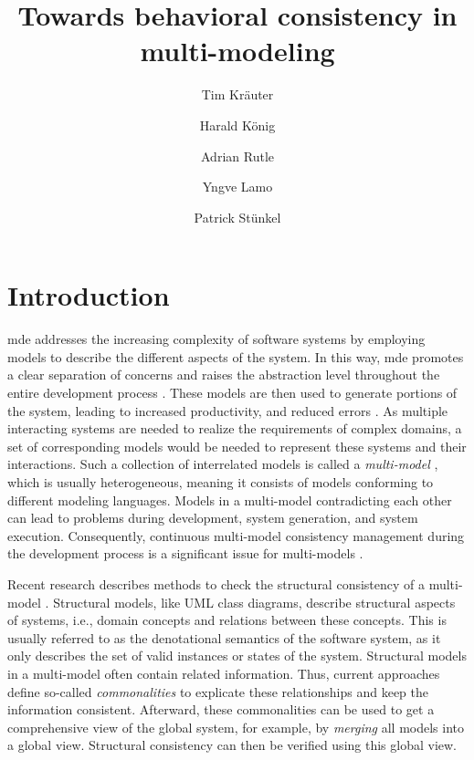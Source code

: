\documentclass{jot}
\title{Towards behavioral consistency in multi-modeling}
\author[$\ast$]{Tim Kräuter}
\author[$\ast\dagger$]{Harald König}
\author[$\ast$]{Adrian Rutle}
\author[$\ast$]{Yngve Lamo}
\author[$\ddagger$]{Patrick Stünkel}
\affil[$\ast$]{Western Norway University of Applied Sciences, Bergen, Norway}
\affil[$\dagger$]{University of Applied Sciences, FHDW, Hannover, Germany}
\affil[$\ddagger$]{Haukeland Universitetssykehus, Bergen, Norway}
\begin{document}
    
\maketitle
{}

\section{Introduction} \label{sec:introduction}
\gls*{mde} addresses the increasing complexity of software systems by employing models to describe the different aspects of the system.
In this way, \gls*{mde} promotes a clear separation of concerns and raises the abstraction level throughout the entire development process \cite{franceModeldrivenDevelopmentComplex2007}.
These models are then used to generate portions of the system, leading to increased productivity, and reduced errors \cite{brambillaModeldrivenSoftwareEngineering2017}.
As multiple interacting systems are needed to realize the requirements of complex domains, a set of corresponding models would be needed to represent these systems and their interactions.
Such a collection of interrelated models is called a \textit{multi-model} \cite{boronatWhatMultimodelingLanguage2009}, which is usually heterogeneous, meaning it consists of models conforming to different modeling languages.
Models in a multi-model contradicting each other can lead to problems during development, system generation, and system execution.
Consequently, continuous multi-model consistency management during the development process is a significant issue for multi-models \cite{spanoudakisInconsistencyManagementSoftware2001, cicchettiMultiviewApproachesSoftware2019}.

Recent research describes methods to check the structural consistency of a multi-model \cite{stunkelComprehensiveSystemsFormal2021, klareCommonalitiesPreservingConsistency2019}.
Structural models, like UML class diagrams, describe structural aspects of systems, i.e., domain concepts and relations between these concepts.
This is usually referred to as the denotational semantics of the software system, as it only describes the set of valid instances or states of the system.
Structural models in a multi-model often contain related information.
Thus, current approaches define so-called \textit{commonalities} to explicate these relationships and keep the information consistent.
Afterward, these commonalities can be used to get a comprehensive view of the global system, for example, by \textit{merging} all models into a global view.
Structural consistency can then be verified using this global view.
\end{document}
